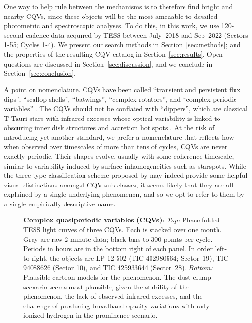 \documentclass[11pt,twocolumn,tighten]{aastex63}
\begin{document}
One way to help rule between the mechanisms is to therefore find
bright and nearby CQVs, since these objects will be the most amenable
to detailed photometric and spectroscopic analyses.  To do this, in
this work, we use 120-second cadence data acquired by TESS between
July~2018 and Sep~2022 (Sectors 1-55; Cycles 1-4).  We present our
search methods in Section~\ref{sec:methods}; and the properties of the
resulting CQV catalog in Section~\ref{sec:results}.  Open questions
are discussed in Section~\ref{sec:discussion}, and we conclude in
Section~\ref{sec:conclusion}.

A point on nomenclature.  CQVs have been called ``transient and
persistent flux dips'', ``scallop shells'', ``batwings'',
\citep{2017AJ....153..152S} ``complex rotators'',
\citep{2019ApJ...876..127Z,2022AJ....163..144G,2023ApJ...945..114P}
and ``complex periodic variables'' \citep{2023MNRAS.518.2921K}.  The
CQVs should not be conflated with ``dippers'', which are classical T
Tauri stars with infrared excesses whose optical variability is linked
to obscuring inner disk structures and accretion hot spots
\citep{2014AJ....147...82C,2021ApJ...908...16R}.  At the risk of
introducing yet another standard, we prefer a nomenclature that
reflects how, when observed over timescales of more than tens of
cycles, CQVs are never exactly periodic.  Their shapes evolve, usually
with some coherence timescale, similar to variability induced by
surface inhomogeneities such as starspots.  While the three-type
classification scheme proposed by \citet{2017AJ....153..152S} may
indeed provide some helpful visual distinctions amongst CQV
sub-classes, it seems likely that they are all explained by a single
underlying phenomenon, and so we opt to refer to them by a single
empirically descriptive name.


\begin{figure*}[!t]
	\begin{center}
		
		\vspace{-0.4cm}
	\end{center}
	\caption{
		{\bf Complex quasiperiodic variables (CQVs)}:
		{\it Top:} Phase-folded TESS light curves of three CQVs.  Each is
		stacked over one month.  Gray are raw 2-minute data; black bins to
		300 points per cycle.  Periods in hours are in the bottom right of
		each panel.  In order left-to-right, the objects are LP 12-502
		(TIC 402980664; Sector~19), TIC 94088626 (Sector 10), and TIC
		425933644 (Sector~28).
		{\it Bottom:} Plausible cartoon models for the phenomenon.  The
		dust clump scenario seems most plausible, given
		the stability of the phenomenon, the lack of observed infrared
		excesses, and the challenge of producing broadband opacity variations
		with only ionized hydrogen in the prominence scenario.
	}
	\label{fig:f1}
\end{figure*}
\end{document}
